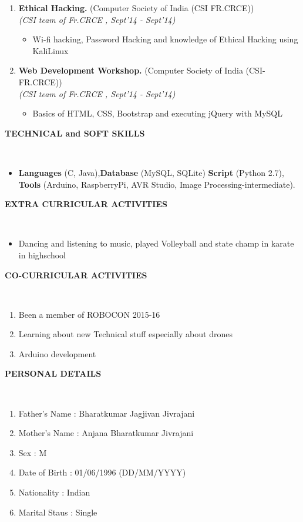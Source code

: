 \documentclass[a4paper,10pt]{article}
\newcommand{\isep}{-2 pt}
\newcommand{\lsep}{-0.5cm}
\newcommand{\resheading}[1]{{\small \colorbox{mygrey}{\begin{minipage}{0.975\textwidth}{\textbf{#1 \vphantom{p\^{E}}}}\end{minipage}}}}
\begin{document}
\begin{enumerate}
\item \textbf{Ethical Hacking.
} (Computer Society of India (CSI FR.CRCE)) \\
 \emph{(CSI team of Fr.CRCE
, Sept'14 - Sept'14)} \\[-0.6cm]
	\begin{itemize}\itemsep \isep
	\item Wi-fi hacking, Password Hacking and knowledge of Ethical Hacking using KaliLinux
	\end{itemize}

\item \textbf{Web Development Workshop.
} (Computer Society of India (CSI-FR.CRCE)) \\
 \emph{(CSI team of Fr.CRCE
, Sept'14 - Sept'14)} \\[-0.6cm]
	\begin{itemize}\itemsep \isep
	\item Basics of HTML, CSS, Bootstrap and executing jQuery with MySQL
	\end{itemize}
\end{enumerate}


\resheading{\textbf{TECHNICAL and SOFT SKILLS} }\\[\lsep]
\begin{itemize}
\item \noindent \textbf{Languages} (C, Java),\textbf{Database} (MySQL, SQLite) \textbf{Script} (Python 2.7), \textbf{Tools} (Arduino, RaspberryPi, AVR Studio, Image Processing-intermediate).
\end{itemize}

\resheading{\textbf{EXTRA CURRICULAR ACTIVITIES} }\\[\lsep]
\begin{itemize}
\item \noindent Dancing and listening to music, played Volleyball and state champ in  karate in highschool
\end{itemize}

\resheading{\textbf{CO-CURRICULAR ACTIVITIES} }\\[\lsep]
\begin{enumerate}
\item \noindent Been a member of ROBOCON 2015-16
\item \noindent Learning about new Technical stuff especially about drones 
\item \noindent  Arduino development
\end{enumerate}

\resheading{\textbf{PERSONAL DETAILS} }\\[\lsep]
\begin{enumerate}
\item \noindent Father's Name	:	Bharatkumar Jagjivan Jivrajani
\item \noindent Mother's Name	:	Anjana Bharatkumar Jivrajani
\item \noindent Sex			:	M	
\item \noindent Date of Birth	:	01/06/1996 (DD/MM/YYYY)
\item \noindent Nationality		:	Indian
\item \noindent Marital Staus	:	Single
\end{enumerate}
\end{document}
